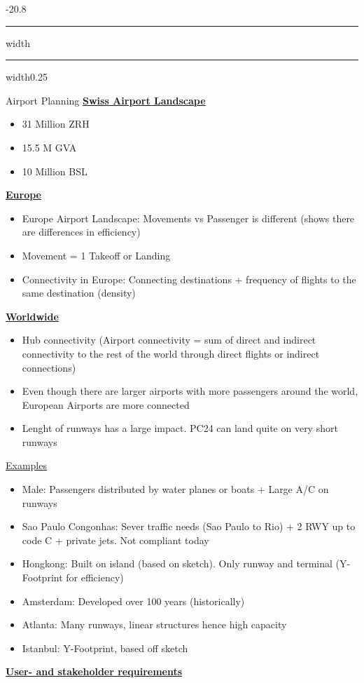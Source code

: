\documentclass[9pt, landscape, fleqn]{scrartcl}
\makeatletter
\renewcommand{\section}{\@startsection{section}{1}{0mm}%
{-2\baselineskip}{0.8\baselineskip}%
{\hrule depth 0.2pt width\columnwidth\hrule depth1.5pt
width0.25\columnwidth\vspace*{1.2em}\Large\bfseries\rmfamily}}
\makeatother
\begin{document}
\begin{multicols*}{3}
\section{Airport Planning}
\underline{\textbf{Swiss Airport Landscape}}
\begin{itemize}
    \item 31 Million ZRH 
    \item 15.5 M GVA 
    \item 10 Million BSL 
\end{itemize}
\underline{\textbf{Europe}}
\begin{itemize}
    \item Europe Airport Landscape: Movements vs Passenger is different (shows there are differences in efficiency)
    \item Movement = 1 Takeoff or Landing 
    \item Connectivity in Europe: Connecting destinations + frequency of flights to the same destination (density)
\end{itemize}
\underline{\textbf{Worldwide}}
\begin{itemize}
    \item Hub connectivity (Airport connectivity = sum of direct and indirect connectivity to the rest of the world through direct flights or indirect connections)
    \item Even though there are larger airports with more passengers around the world, European Airports are more connected
    \item Lenght of runways has a large impact. PC24 can land quite on very short runways 
\end{itemize}
\underline{Examples}
\begin{itemize}
    \item Male: Passengers distributed by water planes or boats + Large A/C on runways 
    \item Sao Paulo Congonhas: Sever traffic needs (Sao Paulo to Rio) + 2 RWY up to code C + private jets. Not compliant today
    \item Hongkong: Built on island (based on sketch). Only runway and terminal (Y-Footprint for efficiency)
    \item Amsterdam: Developed over 100 years (historically)
    \item Atlanta: Many runways, linear structures hence high capacity 
    \item Istanbul: Y-Footprint, based off sketch 
\end{itemize}
\underline{\textbf{User- and stakeholder requirements}}

\end{multicols*}
\end{document}
